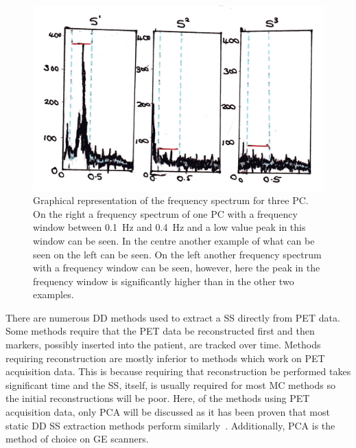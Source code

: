                 \begin{figure}
                    \centering
                        
                    \includegraphics[width=1.0\linewidth]{figures/background_pca_window.png}
                        
                    \captionsetup{singlelinecheck=false, justification=raggedright}
                    \caption{Graphical representation of the frequency spectrum for three \gls{PC}. On the right a frequency spectrum of one \gls{PC} with a frequency window between \SI{0.1}{\hertz} and \SI{0.4}{\hertz} and a low value peak in this window can be seen. In the centre another example of what can be seen on the left can be seen. On the left another frequency spectrum with a frequency window can be seen, however, here the peak in the frequency window is significantly higher than in the other two examples.} \label{fig:data_driven_pca_window}
                \end{figure}
                
                There are numerous \gls{DD} methods used to extract a \gls{SS} directly from \gls{PET} data. Some methods require that the \gls{PET} data be reconstructed first and then markers, possibly inserted into the patient, are tracked over time. Methods requiring reconstruction are mostly inferior to methods which work on \gls{PET} acquisition data. This is because requiring that reconstruction be performed takes significant time and the \gls{SS}, itself, is usually required for most \gls{MC} methods so the initial reconstructions will be poor. Here, of the methods using \gls{PET} acquisition data, only \gls{PCA} will be discussed as it has been proven that most static \gls{DD} \gls{SS} extraction methods perform similarly~\parencite{Thielemans2013ComparisonData}. Additionally, \gls{PCA} is the method of choice on \gls{GE} scanners.
                
